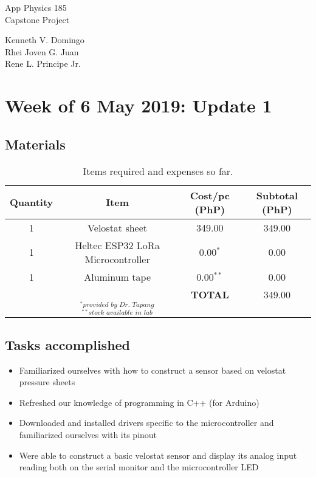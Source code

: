 \documentclass[12pt,a4paper]{article}
\begin{document}
\begin{titlepage}
\begin{center}
\vspace*{\fill}

\Huge{ App Physics 185 \\
Capstone Project
} \\

\qquad
\qquad

\normalsize{Kenneth V. Domingo \\
Rhei Joven G. Juan \\
Rene L. Principe Jr.
}

\vspace*{\fill}
\end{center}
\end{titlepage}

\setcounter{page}{1}

\section*{Week of 6 May 2019: Update 1}
\medskip

\subsection*{Materials}
\begin{table}[h!]
	\centering
	\caption{Items required and expenses so far.}
	\begin{tabular}{cccc}
	Quantity & Item & Cost/pc (PhP) & Subtotal (PhP) \\ \hline
	1 & Velostat sheet & 349.00 & 349.00 \\
	1 & Heltec ESP32 LoRa Microcontroller & 0.00$^*$ & 0.00 \\
	1 & Aluminum tape & 0.00$^{**}$ & 0.00 \\
	& & \textbf{TOTAL} & 349.00 \\
	& $_{^*\textit{provided by Dr. Tapang}}$ & & \\
	& $_{^{**}\textit{stock available in lab}}$ & &
	\end{tabular}
\end{table}

\subsection*{Tasks accomplished}
\begin{itemize}
	\item Familiarized ourselves with how to construct a sensor based on velostat pressure sheets
	\item Refreshed our knowledge of programming in C++ (for Arduino)
	\item Downloaded and installed drivers specific to the microcontroller and familiarized ourselves with its pinout
	\item Were able to construct a basic velostat sensor and display its analog input reading both on the serial monitor and the microcontroller LED
\end{itemize}
\end{document}
